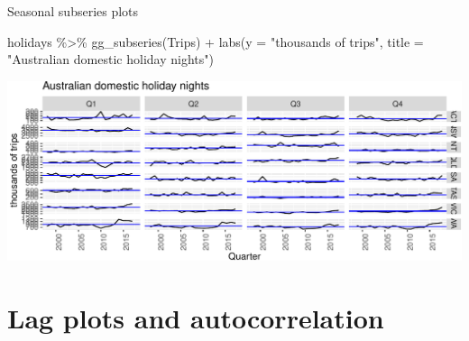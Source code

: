 \documentclass[14pt,ignorenonframetext,aspectratio=169]{beamer}
\newenvironment{Shaded}{\begin{snugshade}}{\end{snugshade}}
\newcommand{\AttributeTok}[1]{\textcolor[rgb]{0.77,0.63,0.00}{#1}}
\newcommand{\FunctionTok}[1]{\textcolor[rgb]{0.00,0.00,0.00}{#1}}
\newcommand{\NormalTok}[1]{#1}
\newcommand{\SpecialCharTok}[1]{\textcolor[rgb]{0.00,0.00,0.00}{#1}}
\newcommand{\StringTok}[1]{\textcolor[rgb]{0.31,0.60,0.02}{#1}}
\renewenvironment{Shaded}{\color{black}\begin{snugshade}\color{black}}{\end{snugshade}}
\renewenvironment{Shaded}{\color{black}\fontsize{10}{10}\sf\begin{snugshade}\color{black}}{\end{snugshade}}
\begin{document}
\begin{frame}[fragile]{Seasonal subseries plots}
\protect\hypertarget{seasonal-subseries-plots-2}{}
\fontsize{9}{10}\sf

\begin{Shaded}
\begin{Highlighting}[]
\NormalTok{holidays }\SpecialCharTok{\%\textgreater{}\%}
  \FunctionTok{gg\_subseries}\NormalTok{(Trips) }\SpecialCharTok{+}
  \FunctionTok{labs}\NormalTok{(}\AttributeTok{y =} \StringTok{"thousands of trips"}\NormalTok{, }\AttributeTok{title =} \StringTok{"Australian domestic holiday nights"}\NormalTok{)}
\end{Highlighting}
\end{Shaded}

\includegraphics{2-tsgraphics_files/figure-beamer/graphics2-1.pdf}
\end{frame}

\hypertarget{lag-plots-and-autocorrelation}{%
\section{Lag plots and
autocorrelation}\label{lag-plots-and-autocorrelation}}
\end{document}
